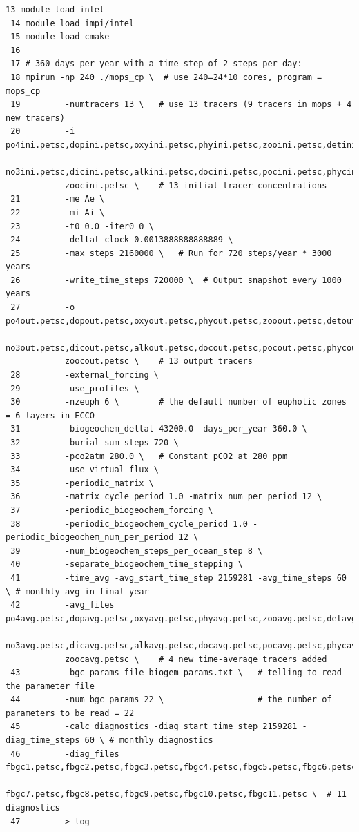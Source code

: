 \documentclass[a4paper]{article}
\begin{document}
\begin{enumerate}
\lstset{language=sh} 
\begin{lstlisting}[frame=single,basicstyle=\scriptsize,commentstyle=\color{blue}]
 13 module load intel
 14 module load impi/intel
 15 module load cmake
 16
 17 # 360 days per year with a time step of 2 steps per day:
 18 mpirun -np 240 ./mops_cp \  # use 240=24*10 cores, program = mops_cp
 19         -numtracers 13 \   # use 13 tracers (9 tracers in mops + 4 new tracers)
 20         -i po4ini.petsc,dopini.petsc,oxyini.petsc,phyini.petsc,zooini.petsc,detini.petsc,
            no3ini.petsc,dicini.petsc,alkini.petsc,docini.petsc,pocini.petsc,phycini.petsc,
            zoocini.petsc \    # 13 initial tracer concentrations
 21         -me Ae \
 22         -mi Ai \
 23         -t0 0.0 -iter0 0 \
 24         -deltat_clock 0.0013888888888889 \
 25         -max_steps 2160000 \   # Run for 720 steps/year * 3000 years
 26         -write_time_steps 720000 \  # Output snapshot every 1000 years
 27         -o po4out.petsc,dopout.petsc,oxyout.petsc,phyout.petsc,zooout.petsc,detout.petsc,
            no3out.petsc,dicout.petsc,alkout.petsc,docout.petsc,pocout.petsc,phycout.petsc,
            zoocout.petsc \    # 13 output tracers 
 28         -external_forcing \
 29         -use_profiles \
 30         -nzeuph 6 \        # the default number of euphotic zones = 6 layers in ECCO 
 31         -biogeochem_deltat 43200.0 -days_per_year 360.0 \
 32         -burial_sum_steps 720 \
 33         -pco2atm 280.0 \   # Constant pCO2 at 280 ppm
 34         -use_virtual_flux \
 35         -periodic_matrix \
 36         -matrix_cycle_period 1.0 -matrix_num_per_period 12 \
 37         -periodic_biogeochem_forcing \
 38         -periodic_biogeochem_cycle_period 1.0 -periodic_biogeochem_num_per_period 12 \
 39         -num_biogeochem_steps_per_ocean_step 8 \
 40         -separate_biogeochem_time_stepping \
 41         -time_avg -avg_start_time_step 2159281 -avg_time_steps 60 \ # monthly avg in final year
 42         -avg_files po4avg.petsc,dopavg.petsc,oxyavg.petsc,phyavg.petsc,zooavg.petsc,detavg.petsc,
            no3avg.petsc,dicavg.petsc,alkavg.petsc,docavg.petsc,pocavg.petsc,phycavg.petsc,
            zoocavg.petsc \    # 4 new time-average tracers added 
 43         -bgc_params_file biogem_params.txt \   # telling to read the parameter file
 44         -num_bgc_params 22 \                   # the number of parameters to be read = 22
 45         -calc_diagnostics -diag_start_time_step 2159281 -diag_time_steps 60 \ # monthly diagnostics 
 46         -diag_files fbgc1.petsc,fbgc2.petsc,fbgc3.petsc,fbgc4.petsc,fbgc5.petsc,fbgc6.petsc,
            fbgc7.petsc,fbgc8.petsc,fbgc9.petsc,fbgc10.petsc,fbgc11.petsc \  # 11 diagnostics 
 47         > log
\end{lstlisting}
 

\end{enumerate}
\end{document}
